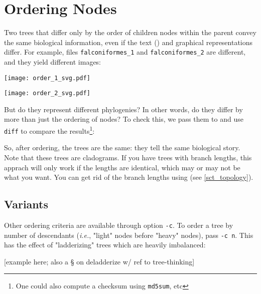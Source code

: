 \section{Ordering Nodes}
\label{sct_order}

Two trees that differ only by the order of children nodes within the parent
convey the same biological information, even if the text (\nw) and graphical
representations differ.  For example, files \texttt{falconiformes\_1} and
\texttt{falconiformes\_2} are different, and they yield different images:


\begin{center}
\texttt{[image: order\_1\_svg.pdf]}
\end{center}


\begin{center}
\texttt{[image: order\_2\_svg.pdf]}
\end{center}

\noindent{}But do they represent different phylogenies? In other words, do they
differ by more than just the ordering of nodes? To check this, we pass them to
\order{} and use \texttt{diff} to compare the results\footnote{One could also compute a checksum using \texttt{md5sum}, etc}:




So, after ordering, the trees are the same: they tell the same biological
story. Note that these trees are cladograms. If you have trees with branch
lengths, this apprach will only work if the lengths are identical, which may or
may not be what you want. You can get rid of the branch lengths using
\topology{} (see \ref{sct_topology}).

\subsection{Variants}

Other ordering criteria are available through option \texttt{-c}. To order a
tree by number of descendants (\textit{i.e.}, "light" nodes before "heavy"
nodes), pass \texttt{-c n}. This has the effect of "ladderizing" trees which are
heavily imbalanced:

[example here; also a § on deladderize w/ ref to tree-thinking]
